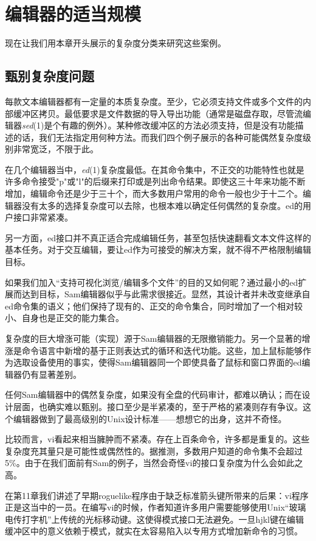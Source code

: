 \documentclass[12pt,oneside]{book}
\begin{document}
\section{编辑器的适当规模}
现在让我们用本章开头展示的复杂度分类来研究这些案例。

\subsection{甄别复杂度问题}
每款文本编辑器都有一定量的本质复杂度。至少，它必须支持文件或多个文件的内部缓冲区拷贝。最低要求是文件数据的导入导出功能（通常是磁盘存取，尽管流编辑器\textit{sed}(1)是个有趣的例外）。某种修改缓冲区的方法必须支持，但是没有功能描述的话，我们无法指定用何种方法。而我们四个例子展示的各种可能偶然复杂度级别非常宽泛，不限于此。

在几个编辑器当中，\textit{ed}(1)复杂度最低。在其命令集中，不正交的功能特性也就是许多命令接受"p"或"l"的后缀来打印或是列出命令结果。即使这三十年来功能不断增加，编辑命令还是少于三十个，而大多数用户常用的命令一般也少于十二个。编辑器没有太多的选择复杂度可以去除，也根本难以确定任何偶然的复杂度。ed的用户接口非常紧凑。

另一方面，ed接口并不真正适合完成编辑任务，甚至包括快速翻看文本文件这样的基本任务。对于交互编辑，要让ed作为可接受的解决方案，就不得不严格限制编辑目标。

如果我们加入“支持可视化浏览/编辑多个文件”的目的又如何昵？通过最小的ed扩展而达到目标，Sam编辑器似乎与此需求很接近。显然，其设计者并未改变继承自ed命令集的语义；他们保持了现有的、正交的命令集合，同时增加了一个相对较小、自身也是正交的能力集合。

复杂度的巨大增涨可能（实现）源于Sam编辑器的无限撤销能力。另一个显著的增涨是命令语言中新增的基于正则表达式的循环和迭代功能。这些，加上鼠标能够作为选取设备使用的事实，使得Sam编辑器同一个即使具备了鼠标和窗口界面的ed编辑器仍有显著差别。

任何Sam编辑器中的偶然复杂度，如果没有全盘的代码审计，都难以确认；而在设计层面，也确实难以甄别。接口至少是半紧凑的，至于严格的紧凑则存有争议。这个编辑器做到了最高级别的Unix设计标准——想想它的出身，这并不奇怪。

比较而言，vi看起来相当臃肿而不紧凑。存在上百条命令，许多都是重复的。这些复杂度充其量只是可能性或偶然性的。据推测，多数用户知道的命令集不会超过5\%{}。由于在我们面前有Sam的例子，当然会奇怪vi的接口复杂度为什么会如此之高。

在第11章我们讲述了早期roguelike程序由于缺乏标准箭头键所带来的后果：vi程序正是这当中的一员。在编写vi的时候，作者知道许多用户需要能够使用Unix“玻璃电传打字机”上传统的光标移动键。这使得模式接口无法避免。一旦hjkl键在编辑缓冲区中的意义依赖于模式，就实在太容易陷入以专用方式增加新命令的习惯。
\end{document}
